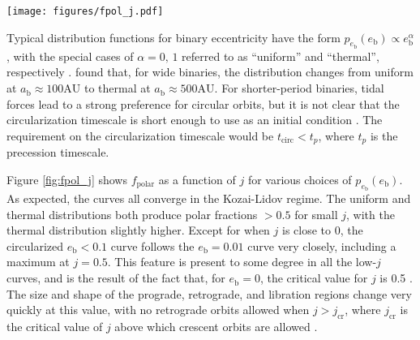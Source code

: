 \documentclass[twocolumn,linenumbers]{aastex631}
\begin{document}
\begin{figure*}
    \centering
    \texttt{[image: figures/fpol\_j.pdf]}
    \caption{
        Polar disk fraction $f_\text{polar}$ as a function of $j$ for various distributions $p_{e_\text{b}}(e_\text{b})$. All cases assume isotropic distributions of initial angular momentum. In the thermal case, $p_{e_\text{b}}(e_\text{b}) \propto e_\text{b}$. In the uniform case, $p_{e_\text{b}}(e_\text{b}) = \text{const}$. The case labeled $e_\text{b} < 0.1$ uses a uniform distribution, but restricts the domain to $e_\text{b} \in [0,0.1)$. These three distributions are shown in the inset. The dashed line cases fix $e_\text{b}$ at a particular value. Notice the maximum that occurs at $j\approx 0.5$. This occurs because the appearance of crescent orbits along with the disappearance of retrograde orbits at $j=j_\text{cr}$ \citep[eq. A3]{martin2019} make the parameter space that eventually evolves to polar very large.
    }
    \label{fig:fpol_j}
\end{figure*}

Typical distribution functions for binary eccentricity have the form $p_{e_\text{b}}(e_\text{b}) \propto e_\text{b}^\alpha$, with the special cases of $\alpha=0,\,1$ referred to as ``uniform'' and ``thermal'', respectively \citep[see also \citealt{ceppi2024}]{hwang2022}. \citet{hwang2022} found that, for wide binaries, the distribution changes from uniform at $a_\text{b}\approx 100\text{AU}$ to thermal at $a_\text{b}\approx 500\text{AU}$. For shorter-period binaries, tidal forces lead to a strong preference for circular orbits, but it is not clear that the circularization timescale is short enough to use as an initial condition \citep[e.g.,][]{meibom2005,geller2012}. The requirement on the circularization timescale would be $t_\text{circ} < t_p$, where $t_p$ is the precession timescale.

Figure \ref{fig:fpol_j} shows $f_\text{polar}$ as a function of $j$ for various choices of $p_{e_\text{b}}(e_\text{b})$. As expected, the curves all converge in the Kozai-Lidov regime. The uniform and thermal distributions both produce polar fractions $>0.5$ for small $j$, with the thermal distribution slightly higher. Except for when $j$ is close to 0, the circularized $e_\text{b} < 0.1$ curve follows the $e_\text{b} = 0.01$ curve very closely, including a maximum at $j=0.5$. This feature is present to some degree in all the low-$j$ curves, and is the result of the fact that, for $e_\text{b}=0$, the critical value for $j$ is 0.5 \citet{abod2022}. The size and shape of the prograde, retrograde, and libration regions change very quickly at this value, with no retrograde orbits allowed when $j>j_\text{cr}$, where $j_\text{cr}$ is the critical value of $j$ above which crescent orbits are allowed \citep[eq. A3]{martin2019}.
\end{document}
